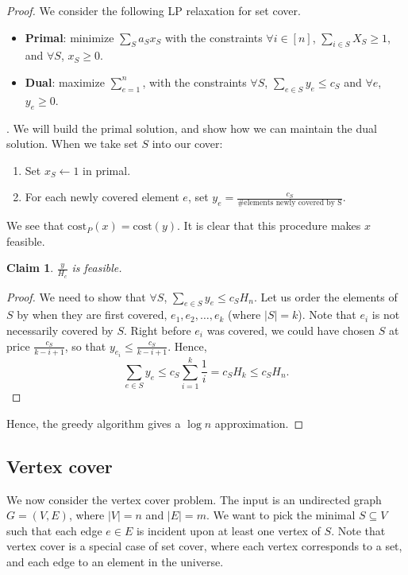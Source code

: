 \documentclass[11pt]{article}
\newtheorem{claim}[theorem]{Claim}
\theoremstyle{definition}
\theoremstyle{remark}
\begin{document}
\begin{proof}
We consider the following LP relaxation for set cover.

\begin{itemize}
    \item \textbf{Primal}: minimize $\sum_S a_S x_S$ with the constraints
    $\forall i \in [n]$, $\sum_{i \in S} X_S \geq 1$,
    and $\forall S$, $x_S \geq 0$.

    \item \textbf{Dual}: maximize $\sum_{e=1}^n$, with the constraints
    $\forall S$, $\sum_{e \in S} y_e \leq c_S$ and $\forall e$, $y_e \geq 0$.
\end{itemize}.
We will build the primal solution,
and show how we can maintain the dual solution.
When we take set $S$ into our cover:
\begin{enumerate}
    \item Set $x_S \leftarrow 1$ in primal.
    \item For each newly covered element $e$, set $y_e = \frac{c_S}{\text{\# elements newly covered by S}}$.
\end{enumerate}
We see that $\mathrm{cost}_P(x) = \mathrm{cost}(y)$.
It is clear that this procedure makes $x$ feasible.
\begin{claim}
    $\frac{y}{H_c}$ is feasible.
\end{claim}
\begin{proof}
    We need to show that $\forall S$, $\sum_{e \in S} y_e \leq c_S H_n$.
    Let us order the elements of $S$ by when they are first covered, $e_1, e_2, \ldots, e_k$
    (where $|S|=k$).
    Note that $e_i$ is not necessarily covered by $S$.
    Right before $e_i$ was covered, we could have chosen $S$ at price
    $\frac{c_S}{k-i+1}$,
    so that $y_{e_i} \leq \frac{c_S}{k-i+1}$.
    Hence, 
    \[
        \sum_{e \in S} y_e \leq c_S \sum_{i=1}^k \frac{1}{i} = c_S H_k \leq c_S H_n.
    \]
\end{proof}
Hence, the greedy algorithm gives a $\log n $ approximation.
\end{proof}

\subsection{Vertex cover}
We now consider the vertex cover problem.
The input is an undirected graph $G=(V, E)$, where $|V|=n$ and $|E|=m$.
We want to pick the minimal $S \subseteq V$ such that each edge $e \in E$ is incident upon at least one vertex of $S$.
Note that vertex cover is a special case of set cover,
where each vertex corresponds to a set, and each edge to an element in the universe.
\end{document}
